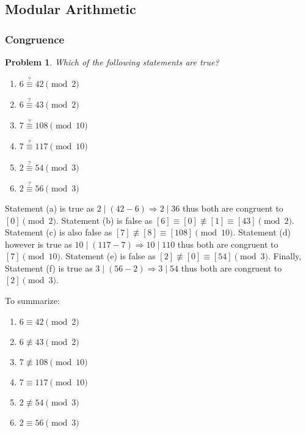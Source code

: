 \documentclass[12pt]{article}
\newtheorem{problem}{Problem}
\numberwithin{problem}{section} %
\theoremstyle{remark}  %
\newenvironment{answer}
    {\begin{adjustwidth}{0pt}{0pt}}
    {\end{adjustwidth}}
\begin{document}
\subsection{Modular Arithmetic}
\subsubsection{Congruence}

    \setcounter{problem}{28}
    \begin{problem}
        Which of the following statements are true?
        \begin{multicols}{3}  
            \begin{enumerate}[label=(\alph*)]
                \item $6 \stackrel{?}{\equiv} 42 \pmod{2}$
                \item $6 \stackrel{?}{\equiv} 43 \pmod{2}$
                \item $7 \stackrel{?}{\equiv} 108 \pmod{10}$
                \item $7 \stackrel{?}{\equiv} 117 \pmod{10}$
                \item $2 \stackrel{?}{\equiv} 54 \pmod{3}$
                \item $2 \stackrel{?}{\equiv} 56 \pmod{3}$
            \end{enumerate}
        \end{multicols}
    \end{problem}
    \begin{answer}
        Statement (a) is true as $2\mid (42-6) \Rightarrow 2\mid 36$ thus both are congruent to $[0] \pmod{2}$. Statement (b) is false as $[6]\equiv[0]\not\equiv[1]\equiv[43]\pmod{2}$. Statement (c) is also false as $[7]\not\equiv [8]\equiv [108] \pmod{10}$. Statement (d) however is true as $10 \mid (117-7) \Rightarrow 10 \mid 110$ thus both are congruent to $[7]\pmod {10}$. Statement (e) is false as $[2]\not\equiv [0]\equiv[54] \pmod{3}$. Finally, Statement (f) is true as $3\mid(56-2)\Rightarrow 3\mid 54$ thus both are congruent to $[2]\pmod{3}$. \par To summarize:
        \begin{multicols}{3}
            \begin{enumerate}[label=(\alph*)]
                \item $6 \equiv 42 \pmod{2}$
                \item $6 \not\equiv 43 \pmod{2}$
                \item $7 \not\equiv 108 \pmod{10}$
                \item $7 \equiv 117 \pmod{10}$
                \item $2 \not\equiv 54 \pmod{3}$
                \item $2 \equiv 56 \pmod{3}$
            \end{enumerate}
        \end{multicols}
    \end{answer}
\end{document}

